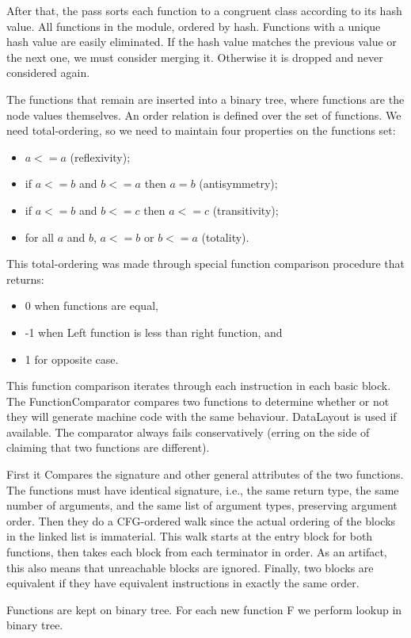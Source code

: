 After that, the pass sorts each function to a congruent class according to
its hash value.
All functions in the module, ordered by hash. Functions with a unique
hash value are easily eliminated.
If the hash value matches the previous value or the next one, we must
consider merging it. Otherwise it is dropped and never considered again.

The functions that remain are inserted into a binary tree, where functions are
the node values themselves.
An order relation is defined over the set of functions.
We need total-ordering, so we need to maintain four properties on the functions set:
\begin{itemize}
\item $a <= a$ (reflexivity);
\item if $a <= b$ and $b <= a$ then $a = b$ (antisymmetry);
\item if $a <= b$ and $b <= c$ then $a <= c$ (transitivity);
\item for all $a$ and $b$, $a <= b$ or $b <= a$ (totality).
\end{itemize}
This total-ordering was made through special function comparison procedure that
returns:
\begin{itemize}
\item 0 when functions are equal,
\item -1 when Left function is less than right function, and
\item 1 for opposite case.
\end{itemize}
This function comparison iterates through each instruction in each basic block.
The FunctionComparator compares two functions to determine whether or not
they will generate machine code with the same behaviour. DataLayout is
used if available. The comparator always fails conservatively (erring on the
side of claiming that two functions are different).

First it Compares the signature and other general attributes of the two functions.
The functions must have identical signature, i.e., the same return type, the same
number of arguments, and the same list of argument types, preserving argument order.
Then they do a CFG-ordered walk since the actual ordering of the blocks in the
linked list is immaterial. This walk starts at the entry block for both
functions, then takes each block from each terminator in order. As an
artifact, this also means that unreachable blocks are ignored.
Finally, two blocks are equivalent if they have equivalent instructions in
exactly the same order.

Functions are kept on binary tree. For each new function F we perform
lookup in binary tree.


